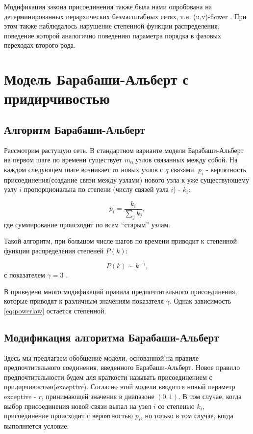\documentclass[10pt,aps,pra]{revtex4-1}
\begin{document}
    Модификация закона присоединения также была нами опробована на детерминированных иерархических безмасштабных сетях, т.н. (u,v)-flower \cite{Dor1}. При этом также наблюдалось нарушение степенной функции распределения, поведение которой аналогично поведению параметра порядка в фазовых переходах второго рода.

\section{Модель Барабаши-Альберт с придирчивостью}

    \subsection{Алгоритм Барабаши-Альберт}

        Рассмотрим растущую сеть. В стандартном варианте модели Барабаши-Альберт \cite{AlBa1} на первом шаге по времени существует $m_0$ узлов связанных между собой. На каждом следующем шаге возникает $m$ новых узлов с $q$ связями. $p_i$ - вероятность присоединения(создание связи между узлами) нового узла к уже существующему узлу $i$ пропорциональна по степени (числу связей узла $i$) - $k_i$:

            \begin{equation}
                p_i = \frac{k_i}{\sum\limits_{j} k_j},
            \end{equation}
                где суммирование происходит по всем “старым” узлам.

        Такой алгоритм, при большом числе шагов по времени приводит к степенной функции распределения степеней $P(k)$:

            \begin{equation}\label{eq:powerlaw}
                P(k) \sim k^{-\gamma},
            \end{equation}
                с показателем $\gamma =3$ \cite{AlBa1}.

        В \cite{AlBa2} приведено много модификаций правила предпочтительного присоединения, которые приводят к различным значениям показателя $\gamma$. Однак зависимость \eqref{eq:powerlaw} остается степенной.

    \subsection{Модификация алгоритма Барабаши-Альберт}

        Здесь мы предлагаем обобщение модели, основанной на правиле предпочтительного соединения, введенного Барабаши-Альберт. Новое правило предпочтительности будем для краткости называть присоединением с придирчивостью(exceptive). Согласно этой модели вводится новый параметр exceptive - $r$, принимающей значения в диапазоне $(0, 1)$. В том случае, когда выбор присоединения новой связи выпал на узел $i$ со степенью $k_i$, присоединение происходит с вероятностью $p_i$, но только в том случае, когда выполняется условие:
\end{document}
